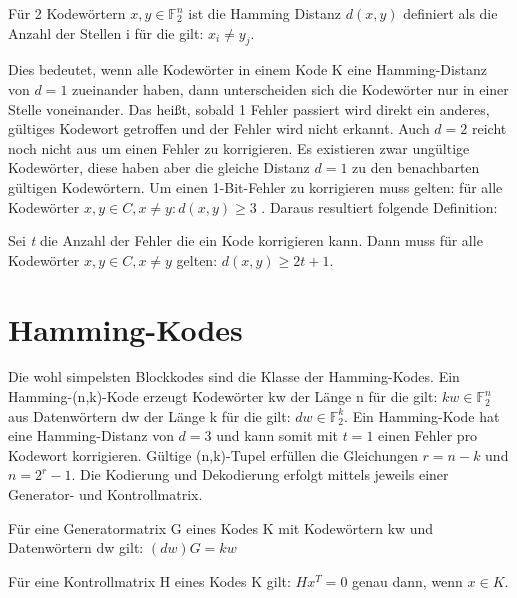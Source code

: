 \begin{t_def}
Für 2 Kodewörtern $x,y \in \mathbb{F}_{2}^{n}$ ist die Hamming Distanz $d(x,y)$ definiert als die Anzahl der Stellen i für die gilt: $x_i \neq y_j$.
\end{t_def}

Dies bedeutet, wenn alle Kodewörter in einem Kode K eine Hamming-Distanz von $d=1$ zueinander haben, dann unterscheiden sich die Kodewörter nur in einer Stelle voneinander. Das heißt, sobald 1 Fehler passiert wird direkt ein anderes, gültiges Kodewort getroffen und der Fehler wird nicht erkannt. Auch $d=2$ reicht noch nicht aus um einen Fehler zu korrigieren. Es existieren zwar ungültige Kodewörter, diese haben aber die gleiche Distanz $d=1$ zu den benachbarten gültigen Kodewörtern. Um einen 1-Bit-Fehler zu korrigieren muss gelten: für alle Kodewörter $x,y \in C,x \neq y \colon d(x,y) \geq 3$ .\cite[S. 7ff]{huffman2010fundamentals} Daraus resultiert folgende Definition:

\begin{t_def}
Sei {\em t} die Anzahl der Fehler die ein Kode korrigieren kann. Dann muss für alle Kodewörter $x,y \in C,x \neq y$ gelten: $d(x,y) \geq 2t + 1$.
\end{t_def}


\section{Hamming-Kodes}
\label{section:hamming}

Die wohl simpelsten Blockkodes sind die Klasse der Hamming-Kodes. Ein Hamming-(n,k)-Kode erzeugt Kodewörter kw der Länge n für die gilt: $kw \in \mathbb{F}_{2}^{n}$ aus Datenwörtern dw der Länge k für die gilt: $dw \in \mathbb{F}_{2}^{k}$. Ein Hamming-Kode hat eine Hamming-Distanz von $d=3$ und kann somit mit $t=1$ einen Fehler pro Kodewort korrigieren. Gültige (n,k)-Tupel erfüllen die Gleichungen $r = n - k$ und $n = 2^r - 1$.\cite[S. 29]{huffman2010fundamentals} Die Kodierung und Dekodierung erfolgt mittels jeweils einer Generator- und Kontrollmatrix.

\begin{t_def}
\label{def:genmatrix}
Für eine Generatormatrix G eines Kodes K mit Kodewörtern kw und Datenwörtern dw gilt: $ (dw)G = kw$
\end{t_def}

\begin{t_def}
\label{def:checkmatrix}
Für eine Kontrollmatrix H eines Kodes K gilt: $ Hx^T = 0$ genau dann, wenn $x \in K$.
\end{t_def}

